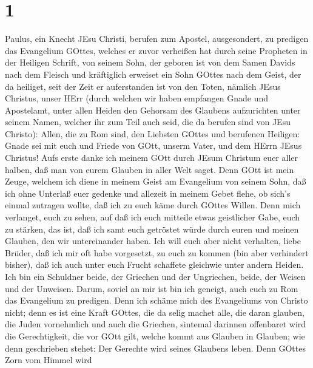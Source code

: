 \hypertarget{section}{%
\section{1}\label{section}}

 Paulus, ein Knecht JEsu Christi, berufen zum Apostel,
ausgesondert, zu predigen das Evangelium GOttes,  welches er
zuvor verheißen hat durch seine Propheten in der Heiligen Schrift,
 von seinem Sohn, der geboren ist von dem Samen Davids nach
dem Fleisch  und kräftiglich erweiset ein Sohn GOttes nach
dem Geist, der da heiliget, seit der Zeit er auferstanden ist von den
Toten, nämlich JEsus Christus, unser HErr  (durch welchen
wir haben empfangen Gnade und Apostelamt, unter allen Heiden den
Gehorsam des Glaubens aufzurichten unter seinem Namen, 
welcher ihr zum Teil auch seid, die da berufen sind von JEsu Christo):
 Allen, die zu Rom sind, den Liebsten GOttes und berufenen
Heiligen: Gnade sei mit euch und Friede von GOtt, unserm Vater, und dem
HErrn JEsus Christus!  Aufs erste danke ich meinem GOtt
durch JEsum Christum euer aller halben, daß man von eurem Glauben in
aller Welt saget.  Denn GOtt ist mein Zeuge, welchem ich
diene in meinem Geist am Evangelium von seinem Sohn, daß ich ohne
Unterlaß euer gedenke  und allezeit in meinem Gebet flehe,
ob sich's einmal zutragen wollte, daß ich zu euch käme durch GOttes
Willen.  Denn mich verlanget, euch zu sehen, auf daß ich
euch mitteile etwas geistlicher Gabe, euch zu stärken,  das
ist, daß ich samt euch getröstet würde durch euren und meinen Glauben,
den wir untereinander haben.  Ich will euch aber nicht
verhalten, liebe Brüder, daß ich mir oft habe vorgesetzt, zu euch zu
kommen (bin aber verhindert bisher), daß ich auch unter euch Frucht
schaffete gleichwie unter andern Heiden.  Ich bin ein
Schuldner beide, der Griechen und der Ungriechen, beide, der Weisen und
der Unweisen.  Darum, soviel an mir ist bin ich geneigt,
auch euch zu Rom das Evangelium zu predigen.  Denn ich
schäme mich des Evangeliums von Christo nicht; denn es ist eine Kraft
GOttes, die da selig machet alle, die daran glauben, die Juden
vornehmlich und auch die Griechen,  sintemal darinnen
offenbaret wird die Gerechtigkeit, die vor GOtt gilt, welche kommt aus
Glauben in Glauben; wie denn geschrieben stehet: Der Gerechte wird
seines Glaubens leben.  Denn GOttes Zorn vom Himmel wird
